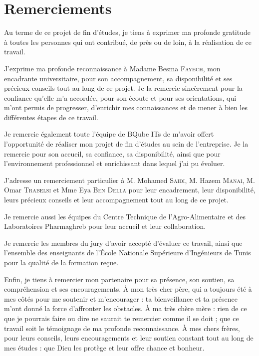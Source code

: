 \chapter*{Remerciements}
\thispagestyle{plain}

Au terme de ce projet de fin d'études, je tiens à exprimer ma profonde gratitude à toutes les personnes qui ont contribué, de près ou de loin, à la réalisation de ce travail.

J'exprime ma profonde reconnaissance à Madame Besma \textsc{Fayech}, mon encadrante universitaire, pour son accompagnement, sa disponibilité et ses précieux conseils tout au long de ce projet. Je la remercie sincèrement pour la confiance qu'elle m'a accordée, pour son écoute et pour ses orientations, qui m'ont permis de progresser, d'enrichir mes connaissances et de mener à bien les différentes étapes de ce travail.

Je remercie également toute l'équipe de BQube ITs de m'avoir offert l'opportunité de réaliser mon projet de fin d'études au sein de l'entreprise. Je la remercie pour son accueil, sa confiance, sa disponibilité, ainsi que pour l'environnement professionnel et enrichissant dans lequel j'ai pu évoluer.

J'adresse un remerciement particulier à M. Mohamed \textsc{Saidi}, M. Hazem \textsc{Manai}, M. Omar \textsc{Trabelsi} et Mme Eya \textsc{Ben Della} pour leur encadrement, leur disponibilité, leurs précieux conseils et leur accompagnement tout au long de ce projet.

Je remercie aussi les équipes du Centre Technique de l'Agro-Alimentaire et des Laboratoires Pharmaghreb pour leur accueil et leur collaboration.

Je remercie les membres du jury d'avoir accepté d'évaluer ce travail, ainsi que l'ensemble des enseignants de l'École Nationale Supérieure d'Ingénieurs de Tunis pour la qualité de la formation reçue.

Enfin, je tiens à remercier mon partenaire pour sa présence, son soutien, sa compréhension et ses encouragements. À mon très cher père, qui a toujours été à mes côtés pour me soutenir et m'encourager : ta bienveillance et ta présence m'ont donné la force d'affronter les obstacles. À ma très chère mère : rien de ce que je pourrais faire ou dire ne saurait te remercier comme il se doit ; que ce travail soit le témoignage de ma profonde reconnaissance. À mes chers frères, pour leurs conseils, leurs encouragements et leur soutien constant tout au long de mes études : que Dieu les protège et leur offre chance et bonheur.
